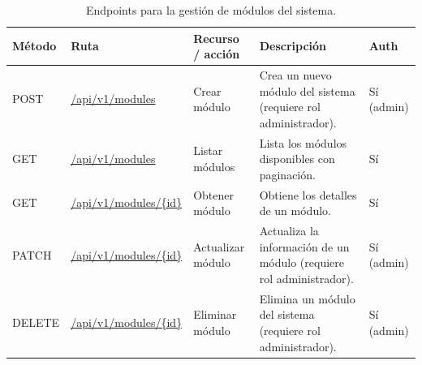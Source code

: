 \begin{table}[H]
\centering
\footnotesize
\setlength{\tabcolsep}{4pt}
\renewcommand{\arraystretch}{1.25}
\begin{tabular}{|p{1.4cm}|p{4.1cm}|p{3.2cm}|p{5.8cm}|p{1cm}|}
\hline
\textbf{Método} & \textbf{Ruta} & \textbf{Recurso / acción} &
\textbf{Descripción} & \textbf{Auth} \\
\hline

POST & \url{/api/v1/modules} & Crear módulo &
Crea un nuevo módulo del sistema (requiere rol administrador). &
Sí (admin) \\
\hline

GET & \url{/api/v1/modules} & Listar módulos &
Lista los módulos disponibles con paginación. &
Sí \\
\hline

GET & \url{/api/v1/modules/{id}} & Obtener módulo &
Obtiene los detalles de un módulo. &
Sí \\
\hline

PATCH & \url{/api/v1/modules/{id}} & Actualizar módulo &
Actualiza la información de un módulo (requiere rol administrador). &
Sí (admin) \\
\hline

DELETE & \url{/api/v1/modules/{id}} & Eliminar módulo &
Elimina un módulo del sistema (requiere rol administrador). &
Sí (admin) \\
\hline

\end{tabular}
\caption{Endpoints para la gestión de módulos del sistema.}
\end{table}